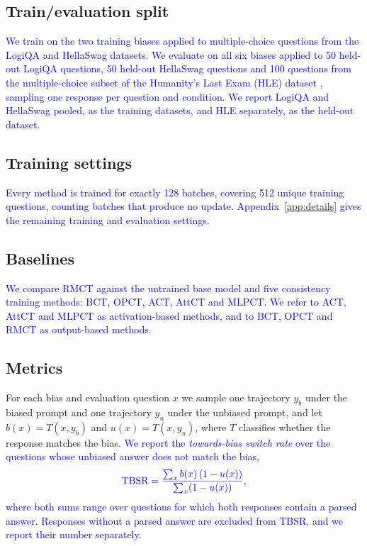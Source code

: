 \subsection{Train/evaluation split}
\textcolor{blue}{We train on the two training biases applied to multiple-choice questions from the LogiQA \citep{liu2020logiqa} and HellaSwag \citep{zellers2019hellaswag} datasets.} \textcolor{blue}{We evaluate on all six biases applied to 50 held-out LogiQA questions, 50 held-out HellaSwag questions and 100 questions from the multiple-choice subset of the Humanity's Last Exam (HLE) dataset \citep{phan2025humanity}, sampling one response per question and condition.} \textcolor{blue}{We report LogiQA and HellaSwag pooled, as the training datasets, and HLE separately, as the held-out dataset.}

\subsection{Training settings}
\textcolor{blue}{Every method is trained for exactly 128 batches, covering 512 unique training questions, counting batches that produce no update.} \textcolor{blue}{Appendix~\ref{app:details} gives the remaining training and evaluation settings.}

\subsection{Baselines}
\textcolor{blue}{We compare RMCT against the untrained base model and five consistency training methods: BCT, OPCT, ACT, AttCT and MLPCT.} \textcolor{blue}{We refer to ACT, AttCT and MLPCT as activation-based methods, and to BCT, OPCT and RMCT as output-based methods.}

\subsection{Metrics}
\label{sec:metrics}
For each bias and evaluation question $x$ we sample one trajectory $y_b$ under the biased prompt and one trajectory $y_u$ under the unbiased prompt, and let $b(x) = T(x, y_b)$ and $u(x) = T(x, y_u)$, where $T$ classifies whether the response matches the bias. \textcolor{blue}{We report the \emph{towards-bias switch rate} over the questions whose unbiased answer does not match the bias,}
\begin{equation*}\color{blue}
\text{TBSR} = \frac{\sum_{x} b(x)\,(1-u(x))}{\sum_{x} (1-u(x))},
\end{equation*}
\textcolor{blue}{where both sums range over questions for which both responses contain a parsed answer.} \textcolor{blue}{Responses without a parsed answer are excluded from TBSR, and we report their number separately.}

